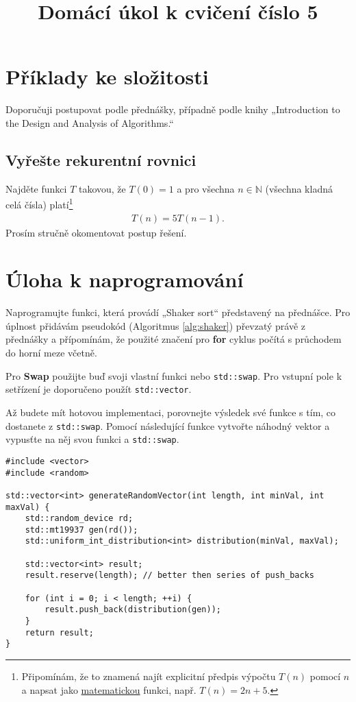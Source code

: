 \documentclass[12pt,oneside]{article}
\title{Domácí úkol k cvičení číslo 5}
\begin{document}
	\maketitle
	\section{Příklady ke složitosti}
	Doporučuji postupovat podle přednášky, případně podle knihy „Introduction to the Design and Analysis of Algorithms.“
	\subsection{Vyřešte rekurentní rovnici}
	Najděte funkci $T$ takovou, že $T(0) = 1$ a pro všechna $n \in \mathbb{N}$ (všechna kladná celá čísla) platí\footnote{	Připomínám, že to znamená najít explicitní předpis výpočtu $T(n)$ pomocí $n$ a napsat jako \underline{matematickou} funkci, např. $T(n) = 2n + 5$.}
	\begin{align}
		T(n) = 5 T(n-1).
	\end{align}
	Prosím stručně okomentovat postup řešení.
	
	
	\section{Úloha k naprogramování}
	Naprogramujte funkci, která provádí „Shaker sort“ představený na přednášce.
	Pro úplnost přidávám pseudokód (Algoritmus \ref{alg:shaker}) převzatý právě z přednášky a přípomínám, že použité značení pro \textbf{for} cyklus počítá s průchodem do horní meze včetně.
	
	


Pro \textbf{Swap} použijte buď svoji vlastní funkci nebo \verb|std::swap|.
Pro vstupní pole k setřízení je doporučeno použít \verb*|std::vector|.



Až budete mít hotovou implementaci, porovnejte výsledek své funkce s tím, co dostanete z \verb|std::swap|.
Pomocí následující funkce vytvořte náhodný vektor a vypusťte na něj svou funkci a \verb|std::swap|.

\begin{lstlisting}
#include <vector>
#include <random>

std::vector<int> generateRandomVector(int length, int minVal, int maxVal) {
	std::random_device rd;
	std::mt19937 gen(rd());
	std::uniform_int_distribution<int> distribution(minVal, maxVal);
	
	std::vector<int> result;
	result.reserve(length); // better then series of push_backs
	
	for (int i = 0; i < length; ++i) {
		result.push_back(distribution(gen));
	}
	return result;
}
\end{lstlisting}
\end{document}
